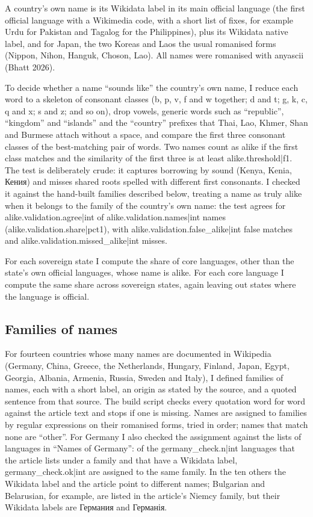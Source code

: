 \documentclass[11pt,a4paper]{article}
\newcommand{\un}[1]{{\uni #1}}
\begin{document}
A country's own name is its Wikidata label in its main official language (the first official language with a Wikimedia code, with a short list of fixes, for example Urdu for Pakistan and Tagalog for the Philippines), plus its Wikidata native label, and for Japan, the two Koreas and Laos the usual romanised forms (Nippon, Nihon, Hanguk, Choson, Lao). All names were romanised with anyascii (Bhatt 2026).

To decide whether a name ``sounds like'' the country's own name, I reduce each word to a skeleton of consonant classes (b, p, v, f and w together; d and t; g, k, c, q and x; s and z; and so on), drop vowels, generic words such as ``republic'', ``kingdom'' and ``islands'' and the ``country'' prefixes that Thai, Lao, Khmer, Shan and Burmese attach without a space, and compare the first three consonant classes of the best-matching pair of words. Two names count as alike if the first class matches and the similarity of the first three is at least {{alike.threshold|f1}}. The test is deliberately crude: it captures borrowing by sound (Kenya, Kenia, \un{Кения}) and misses shared roots spelled with different first consonants. I checked it against the hand-built families described below, treating a name as truly alike when it belongs to the family of the country's own name: the test agrees for {{alike.validation.agree|int}} of {{alike.validation.names|int}} names ({{alike.validation.share|pct1}}), with {{alike.validation.false_alike|int}} false matches and {{alike.validation.missed_alike|int}} misses.

For each sovereign state I compute the share of core languages, other than the state's own official languages, whose name is alike. For each core language I compute the same share across sovereign states, again leaving out states where the language is official.

\subsection{Families of names}

For fourteen countries whose many names are documented in Wikipedia (Germany, China, Greece, the Netherlands, Hungary, Finland, Japan, Egypt, Georgia, Albania, Armenia, Russia, Sweden and Italy), I defined families of names, each with a short label, an origin as stated by the source, and a quoted sentence from that source. The build script checks every quotation word for word against the article text and stops if one is missing. Names are assigned to families by regular expressions on their romanised forms, tried in order; names that match none are ``other''. For Germany I also checked the assignment against the lists of languages in ``Names of Germany'': of the {{germany_check.n|int}} languages that the article lists under a family and that have a Wikidata label, {{germany_check.ok|int}} are assigned to the same family. In the ten others the Wikidata label and the article point to different names; Bulgarian and Belarusian, for example, are listed in the article's Niemcy family, but their Wikidata labels are \un{Германия} and \un{Германія}.
\end{document}
